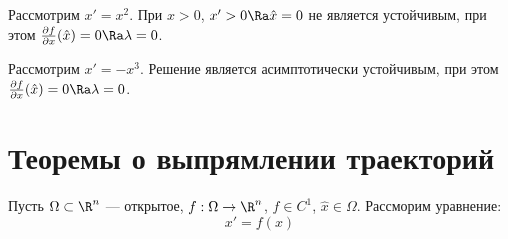 \begin{example}
    Рассмотрим \(x' = x^2\). При \(x > 0\), \(x' > 0 \Ra \hat{x} = 0\) не является устойчивым, при этом \(\frac{\partial f}{\partial x}(\hat{x}) = 0 \Ra \lambda = 0\).
\end{example}

\begin{example}
    Рассмотрим \(x' = -x^3\). Решение является асимптотически устойчивым, при этом \(\frac{\partial f}{\partial x}(\hat{x}) = 0 \Ra \lambda = 0\).
\end{example}

\section{Теоремы о выпрямлении траекторий}
Пусть \(\Omega \subset \R^n\) --- открытое, \(f: \Omega \to \R^n\), \(f \in C^1\), \(\widehat{x} \in \Omega\). Рассморим уравнение:
\begin{equation}
    x' = f(x)
\end{equation}

